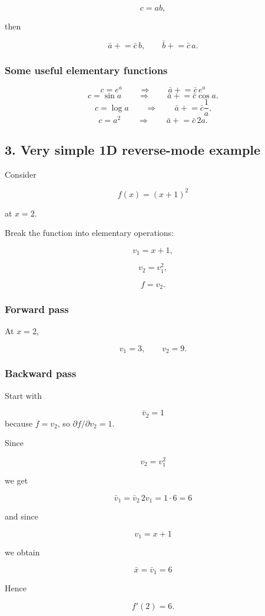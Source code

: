 \documentclass[10pt]{article}
\begin{document}
\[
c=ab,
\]

then

\[
\bar a \mathrel{+}= \bar c\,b,
\qquad
\bar b \mathrel{+}= \bar c\,a.
\]

\subsubsection*{Some useful elementary functions}
\[
c = e^a \qquad \Rightarrow \qquad \bar a \mathrel{+}= \bar c\,e^a
\]
\[
c=\sin a \qquad \Rightarrow \qquad \bar a \mathrel{+}= \bar c\cos a.
\]
\[
c=\log a \qquad \Rightarrow \qquad \bar a \mathrel{+}= \bar c\frac{1}{a}.
\]
\[
c=a^2 \qquad \Rightarrow \qquad \bar a \mathrel{+}= \bar c\,2a.
\]

\subsection*{3. Very simple 1D reverse-mode example}
Consider

\[
f(x)=(x+1)^2
\]

at $x=2$.

Break the function into elementary operations:

\[
v_1=x+1,
\]

\[
v_2=v_1^2,
\]

\[
f=v_2.
\]

\subsubsection*{Forward pass}
At $x=2$,

\[
v_1=3,
\qquad
v_2=9.
\]

\subsubsection*{Backward pass}
Start with

\[
\bar v_2=1
\]
because $f=v_2$, so $\partial f/\partial v_2=1$.

Since

\[
v_2=v_1^2
\]

we get

\[
\bar v_1
=
\bar v_2\,2v_1
=1\cdot 6
=6
\]

and since

\[
v_1=x+1
\]

we obtain

\[
\bar x=\bar v_1=6
\]

Hence

\[
f'(2)=6.
\]
\end{document}

